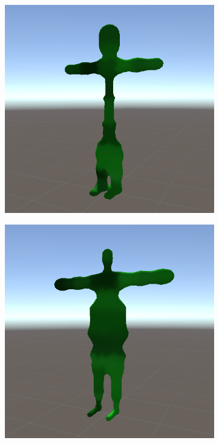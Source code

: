 \begin{figure}[ht]
\begin{subfigure}[b]{0.2\textwidth}
    \end{subfigure}
    \begin{subfigure}[b]{0.2\textwidth}
        \centering
        \includegraphics[width=\textwidth, height=\textwidth]{resources/img/Finished_Creatures_2/creature_4}
    \end{subfigure}
    \begin{subfigure}[b]{0.2\textwidth}
        \centering        
        \includegraphics[width=\textwidth, height=\textwidth]{resources/img/Finished_Creatures_2/creature_5}

\end{subfigure}
\end{figure}
